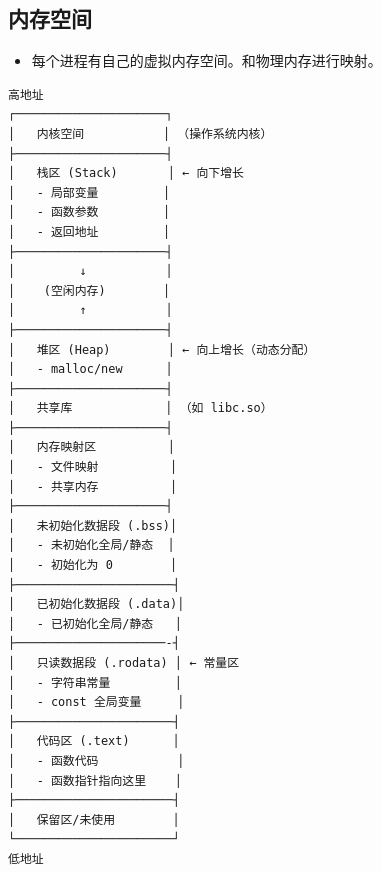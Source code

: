 
\subsection{内存空间}
\begin{itemize}
\item 每个进程有自己的虚拟内存空间。和物理内存进行映射。
\end{itemize}

\begin{lstlisting}[language=none]
高地址
┌─────────────────────┐
│   内核空间           │ （操作系统内核）
├─────────────────────┤
│   栈区 (Stack)       │ ← 向下增长
│   - 局部变量         │
│   - 函数参数         │
│   - 返回地址         │
├─────────────────────┤
│         ↓           │
│    (空闲内存)        │
│         ↑           │
├─────────────────────┤
│   堆区 (Heap)        │ ← 向上增长（动态分配）
│   - malloc/new      │
├─────────────────────┤
│   共享库             │ （如 libc.so）
├─────────────────────┤
│   内存映射区          │
│   - 文件映射          │
│   - 共享内存          │
├─────────────────────┤
│   未初始化数据段 (.bss)│
│   - 未初始化全局/静态  │
│   - 初始化为 0        │
├──────────────────────┤
│   已初始化数据段 (.data)│
│   - 已初始化全局/静态   │
├─────────────────────-┤
│   只读数据段 (.rodata) │ ← 常量区
│   - 字符串常量         │
│   - const 全局变量     │
├──────────────────────┤
│   代码区 (.text)      │
│   - 函数代码           │
│   - 函数指针指向这里    │
├──────────────────────┤
│   保留区/未使用        │
└──────────────────────┘
低地址
\end{lstlisting}
